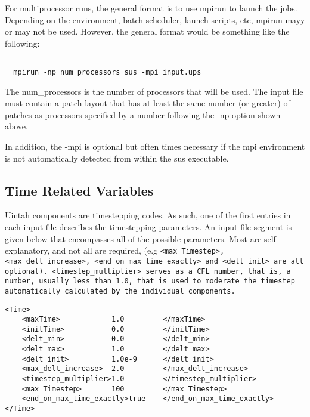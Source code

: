 For multiprocessor runs, the general format is to use mpirun to launch
the jobs.  Depending on the environment, batch scheduler, launch
scripts, etc, mpirun mayy or may not be used.  However, the general
format would be something like the following:

\begin{Verbatim}

  mpirun -np num_processors sus -mpi input.ups

\end{Verbatim}

The num_processors is the number of processors that will be used.  The
input file must contain a patch layout that has at least the same
number (or greater) of patches as processors specified by a number
following the -np option shown above.

In addition, the -mpi is optional but often times necessary if the mpi
environment is not automatically detected from within the sus
executable.
 
\subsection{Time Related Variables} \label{Sec:TimeRelatedVariables}
Uintah components are timestepping codes.  As such, one of the first entries
in each input file describes the timestepping parameters.  An input file
segment is given below that encompasses all of the possible parameters.
Most are self-explanatory, and not all are required,
(e.g \tt <max\_Timestep>,
<max\_delt\_increase>, <end\_on\_max\_time\_exactly> \normalfont and
\tt <delt\_init> \normalfont are all optional).
\tt <timestep\_multiplier> \normalfont serves
as a CFL number, that is, a number, usually less than 1.0, that is used to
moderate the timestep automatically calculated by the individual components. 

\begin{Verbatim}[fontsize=\footnotesize]
<Time>
    <maxTime>            1.0         </maxTime>
    <initTime>           0.0         </initTime>
    <delt_min>           0.0         </delt_min>
    <delt_max>           1.0         </delt_max>
    <delt_init>          1.0e-9      </delt_init>
    <max_delt_increase>  2.0         </max_delt_increase>
    <timestep_multiplier>1.0         </timestep_multiplier>
    <max_Timestep>       100         </max_Timestep>
    <end_on_max_time_exactly>true    </end_on_max_time_exactly>
</Time>

\end{Verbatim}
%
